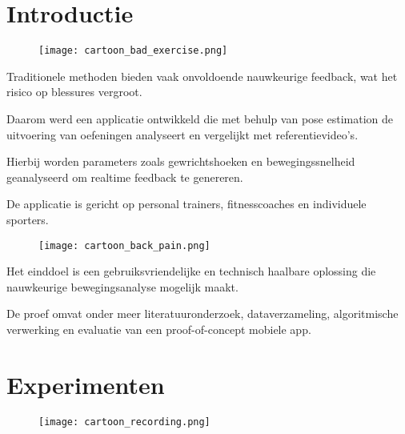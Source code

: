 \documentclass[a0,portrait]{hogent-poster}
\begin{document}
\begin{multicols}{2} %

\section{Introductie}

\begin{wrapfigure}{r}{0.5\linewidth}
  \vspace{-10pt}
  \centering
  \texttt{[image: cartoon\_bad\_exercise.png]}
\end{wrapfigure}

Traditionele methoden bieden vaak onvoldoende nauwkeurige feedback, wat het risico op blessures vergroot. 

Daarom werd een applicatie ontwikkeld die met behulp van pose estimation de uitvoering van oefeningen analyseert en vergelijkt met referentievideo’s. 

Hierbij worden parameters zoals gewrichtshoeken en bewegingssnelheid geanalyseerd om realtime feedback te genereren. 

De applicatie is gericht op personal trainers, fitnesscoaches en individuele sporters. 

\vspace{1em}

\begin{wrapfigure}{l}{0.5\linewidth}
  \vspace{-10pt}
  \centering
  \texttt{[image: cartoon\_back\_pain.png]}
\end{wrapfigure}

Het einddoel is een gebruiksvriendelijke en technisch haalbare oplossing die nauwkeurige bewegingsanalyse mogelijk maakt. 

De proef omvat onder meer literatuuronderzoek, dataverzameling, algoritmische verwerking en evaluatie van een proof-of-concept mobiele app.

\section{Experimenten}

\begin{wrapfigure}{r}{0.5\linewidth}
  \vspace{-10pt}
  \centering
  \texttt{[image: cartoon\_recording.png]}
\end{wrapfigure}


\end{multicols}
\end{document}
